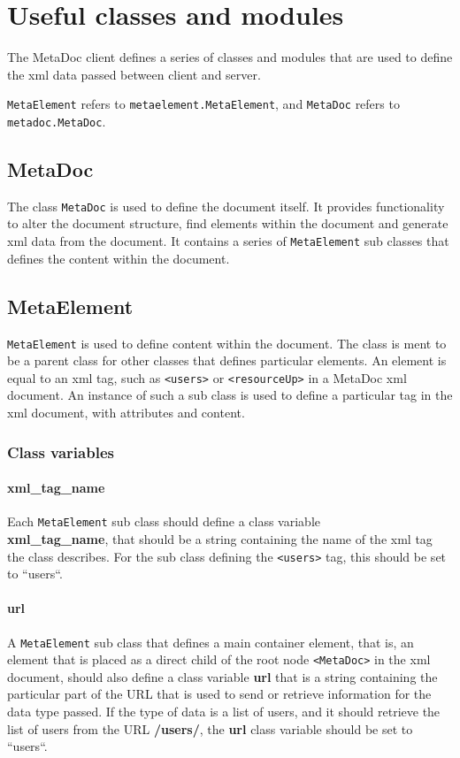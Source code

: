 \newpage
\section{Useful classes and modules}
\label{sec:useful_classes}
The MetaDoc client defines a series of classes and modules that are used to
define the \gls{xml} data passed between client and server. 

\texttt{MetaElement} refers to \texttt{metaelement.MetaElement}, and
\texttt{MetaDoc} refers to \\ \texttt{metadoc.MetaDoc}.

\subsection{MetaDoc}
The class \texttt{MetaDoc} is used to define the document itself. It provides
functionality to alter the document structure, find elements within the
document and generate \gls{xml} data from the document. It contains a series of
\texttt{MetaElement} sub classes that defines the content within the document.

\subsection{MetaElement}
\texttt{MetaElement} is used to define content within the document.  The class
is ment to be a parent class for other classes that defines particular
elements. An element is equal to an \gls{xml} tag, such as \texttt{<users>} or
\texttt{<resourceUp>} in a MetaDoc \gls{xml} document. An instance of such a
sub class is used to define a particular tag in the \gls{xml} document, with
attributes and content.  

\subsubsection{Class variables}

\paragraph{xml\_tag\_name}
Each \texttt{MetaElement} sub class should define a class variable \\
\textbf{xml\_tag\_name}, that should be a string containing the name of the
\gls{xml} tag the class describes. For the sub class defining the
\texttt{<users>} tag, this should be set to ``users``. 

\paragraph{url}
A \texttt{MetaElement} sub class that defines a main container element, that
is, an element that is placed as a direct child of the root node
\texttt{<MetaDoc>} in the \gls{xml} document, should also define a class
variable \textbf{url} that is a string containing the particular part of the
URL that is used to send or retrieve information for the data type passed. If
the type of data is a list of users, and it should retrieve the list of users
from the URL \textbf{/users/}, the \textbf{url} class variable should be set to
``users``.

